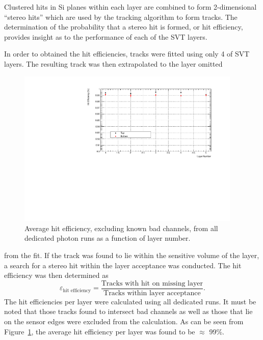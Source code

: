 
%
%
 
Clustered hits in Si planes within each layer are combined to form
2-dimensional ``stereo hits'' which are used by the tracking algorithm to 
form tracks.  The determination of the probability that a stereo hit is 
formed, or hit efficiency, provides insight as to the performance of each of 
the SVT layers.

In order to obtained the hit efficiencies, tracks were fitted using only 4 of 
SVT layers. The resulting track was then extrapolated to the layer omitted
\begin{figure}[h]
    	\includegraphics[width=0.95\textwidth]{test2012/svtperformance/trk_performance/hit_efficiency_vs_layer.pdf}
        \caption{{\small
                    Average hit efficiency, excluding known bad channels, 
                    from all dedicated photon runs as a function of layer
                    number.  
                }} 
	\label{fig:hit_track_efficiency}
\end{figure}
from the fit. If the track was found to lie within the sensitive volume
of the layer, a search for a stereo hit within the layer acceptance was 
conducted.  The hit efficiency was then determined as
\[
    \varepsilon_{\mbox{hit efficiency}} = \frac{\mbox{Tracks with hit on missing layer}}
                                            {\mbox{Tracks within layer acceptance}}.
\]
The hit efficiencies per layer were calculated using all dedicated runs. It must 
be noted that those tracks found to intersect bad channels as well as those that 
lie on the sensor edges were excluded from the calculation. As 
can be seen from Figure~\ref{fig:hit_track_efficiency}, the average hit efficiency
per layer was found to be $\approx$ 99\%. 

